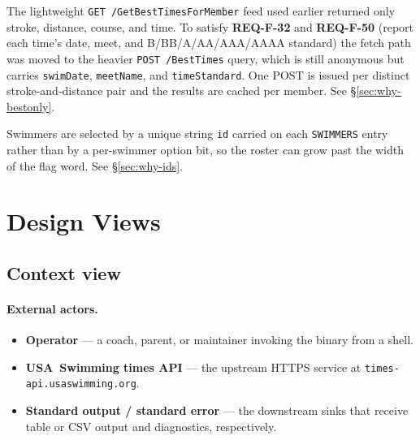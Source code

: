 \documentclass[12pt]{article}
\newcommand{\code}[1]{\texttt{#1}}
\newcommand{\req}[1]{\textbf{#1}}
\begin{document}
\begin{description}[style=nextline]
  \item[D-8: Rich best-times query for date, meet, and standard.]
        The lightweight \code{GET /GetBestTimesForMember} feed used
        earlier returned only stroke, distance, course, and time.
        To satisfy \req{REQ-F-32} and \req{REQ-F-50} (report each
        time's date, meet, and B/BB/A/AA/AAA/AAAA standard) the fetch
        path was moved to
        the heavier \code{POST /BestTimes} query, which is still
        anonymous but carries \code{swimDate}, \code{meetName}, and
        \code{timeStandard}.  One POST is issued per distinct
        stroke-and-distance pair and the results are cached per
        member.  See \S\ref{sec:why-bestonly}.

  \item[D-7: Id-based swimmer selection.]
        Swimmers are selected by a unique string \code{id} carried
        on each \code{SWIMMERS} entry rather than by a per-swimmer
        option bit, so the roster can grow past the width of the
        flag word.  See \S\ref{sec:why-ids}.
\end{description}

\section{Design Views}

\subsection{Context view}

\paragraph{External actors.}
\begin{itemize}
  \item \textbf{Operator} --- a coach, parent, or maintainer
        invoking the binary from a shell.
  \item \textbf{USA~Swimming times API} --- the upstream HTTPS
        service at \texttt{times-api.usaswimming.org}.
  \item \textbf{Standard output / standard error} --- the
        downstream sinks that receive table or CSV output and
        diagnostics, respectively.
\end{itemize}
\end{document}

